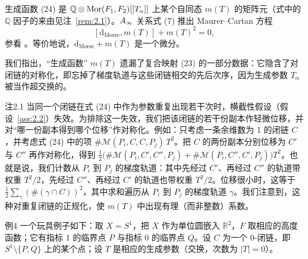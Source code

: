 生成函数 (24) 是 $\mathbb Q\otimes\operatorname{Mor}(F_1,F_2)[[T_\alpha]]$ 上某个自同态 $m(T)$ 的矩阵元（式中的 $\mathbb Q$ 因子的来由见注~\ref{rem:2.1}）。$A_\infty$ 关系式 (7) 推出 Maurer--Cartan 方程
\begin{equation}\tag{25}\label{eq:25}
  [\mathrm{d}_{\mathrm{Morse}},m(T)]+m(T)^2=0,
\end{equation}
参看 \cite{lysov}。等价地说，$\mathrm{d}_{\mathrm{Morse}}+m(T)$ 是一个微分。


我们指出，“生成函数” $m(T)$ 遗漏了复合映射 (23) 的一部分数据：它隐含了对闭链的对称化，即忘掉了梯度轨道与这些闭链相交的先后次序，因为生成参数 $T_\alpha$ 被当作超交换的。

\begin{thmenv}{注}{2.1}\label{rem:2.1}
当同一个闭链在式 (24) 中作为参数重复出现若干次时，横截性假设（假设~\ref{ass:2.2}）失效。为排除这一失效，我们把该闭链的若干份副本作轻微位移，并对“哪一份副本得到哪个位移”作对称化。例如：只考虑一条余维数为 1 的闭链 $C$，并考虑式 (24) 中的项 $\#\mathcal M(P_i,C,C,P_j)\,T^2$。把 $C$ 的两份副本分别位移为 $C'$ 与 $C''$ 再作对称化，得到 $\tfrac12\bigl(\#\mathcal M(P_i,C',C'',P_j)+\#\mathcal M(P_i,C'',C',P_j)\bigr)T^2$。也就是说，我们计数从 $P_i$ 到 $P_j$ 的梯度轨道：其中先经过 $C'$、再经过 $C''$ 的轨道带权重 $T^2/2$，先经过 $C''$、再经过 $C'$ 的轨道也带权重 $T^2/2$。位移很小时，这等于 $\tfrac12\sum_\gamma(\#(\gamma\cap C))^2$，其中求和遍历从 $P_i$ 到 $P_j$ 的梯度轨道 $\gamma$。我们注意到，这种对重复闭链的正规化，使 $m(T)$ 中出现有理（而非整数）系数。
\end{thmenv}


\begin{thmenv}{例}{4}\label{ex:4}
一个玩具例子如下：取 $X=S^1$，把 $X$ 作为单位圆嵌入 $\mathbb R^2$，$F$ 取相应的高度函数；它有指标 1 的临界点 $P$ 与指标 0 的临界点 $Q$。设 $C$ 为一个 0-闭链，即 $S^1\setminus\{P,Q\}$ 上的某个点；设 $T$ 是相应的生成参数（交换，次数为 $|T|=0$）。
\end{thmenv}

